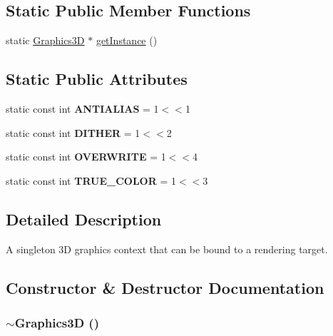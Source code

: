 \subsection*{Static Public Member Functions}
\begin{CompactItemize}
\item 
static \hyperlink{classm3g_1_1Graphics3D}{Graphics3D} $\ast$ \hyperlink{classm3g_1_1Graphics3D_da6d71754bfe755dd8204a9332e9ed47}{getInstance} ()
\end{CompactItemize}
\subsection*{Static Public Attributes}
\begin{CompactItemize}
\item 
\hypertarget{classm3g_1_1Graphics3D_9df12c5332904e66a962e1bf2809a812}{
static const int \textbf{ANTIALIAS} = 1$<$$<$1}
\label{classm3g_1_1Graphics3D_9df12c5332904e66a962e1bf2809a812}

\item 
\hypertarget{classm3g_1_1Graphics3D_3750f57b82328be988bdab3b672a64f9}{
static const int \textbf{DITHER} = 1$<$$<$2}
\label{classm3g_1_1Graphics3D_3750f57b82328be988bdab3b672a64f9}

\item 
\hypertarget{classm3g_1_1Graphics3D_f448f7f447a301823af9170bfe84c50e}{
static const int \textbf{OVERWRITE} = 1$<$$<$4}
\label{classm3g_1_1Graphics3D_f448f7f447a301823af9170bfe84c50e}

\item 
\hypertarget{classm3g_1_1Graphics3D_bbd22a6baea672f895d5ef32e2438ec6}{
static const int \textbf{TRUE\_\-COLOR} = 1$<$$<$3}
\label{classm3g_1_1Graphics3D_bbd22a6baea672f895d5ef32e2438ec6}

\end{CompactItemize}


\subsection{Detailed Description}
A singleton 3D graphics context that can be bound to a rendering target. 

\subsection{Constructor \& Destructor Documentation}
\hypertarget{classm3g_1_1Graphics3D_9b9347476fc10e57b31694ac8a628511}{
\subsubsection[{$\sim$Graphics3D}]{\setlength{\rightskip}{0pt plus 5cm}$\sim${\bf Graphics3D} ()}}
\label{classm3g_1_1Graphics3D_9b9347476fc10e57b31694ac8a628511}



